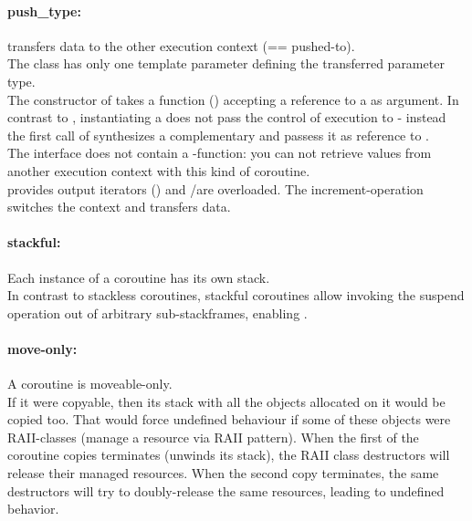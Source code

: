 \paragraph*{push\_type:}
\pushcoro transfers data to the other execution context (== pushed-to).\\
The class has only one template parameter defining the transferred parameter
type.\\
The constructor of \pushcoro takes a function (\corofunction) accepting a
reference to a \pullcoro as argument. In contrast to \pullcoro, instantiating a
\pushcoro does not pass the control of execution to \corofunction{ }- instead
the first call of \pushcoroop synthesizes a complementary \pullcoro and passess
it as reference to \corofunction.\\
\newline
The interface does not contain a \get-function: you can not retrieve
values from another execution context with this kind of coroutine.\\
\newline
\pushcoro provides output iterators (\pushcoroiterator) and \bgin/\ed are overloaded. The
increment-operation switches the context and transfers data.

\paragraph*{stackful:}
Each instance of a coroutine has its own stack.\\
\newline
In contrast to stackless coroutines, stackful coroutines allow invoking the
suspend operation out of arbitrary sub-stackframes, enabling \escreops.

\paragraph*{move-only:}
A coroutine is moveable-only.\\
\newline
If it were copyable, then its stack with all the objects allocated on it
would be copied too. That would force undefined behaviour if some of these objects
were RAII-classes (manage a resource via RAII pattern). When the first of the
coroutine copies terminates (unwinds its stack), the RAII class destructors will
release their managed resources. When the second copy terminates, the same
destructors will try to doubly-release the same resources, leading to undefined
behavior.

